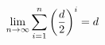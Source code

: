 \documentclass[preview]{standalone}
\begin{document}
\begin{align*}
\lim_{n \to \infty} \sum_{i=1}^{n} \left({ d } \over {2} \right)^i = { d }
\end{align*}
\end{document}
